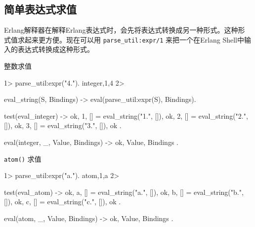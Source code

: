 \documentclass[preview,multi,crop=false,border=1in,class=memoir]{standalone}
\begin{document}
\begin{preview-page}
\section{简单表达式求值}


Erlang解释器在解释Erlang表达式时，会先将表达式转换成另一种形式。这种形
式值求起来更方便。现在可以用 \verb|parse_util:expr/1| 来把一个在Erlang
Shell中输入的表达式转换成这种形式。


整数求值

\begin{ErlangShellSession}
1> parse_util:expr("4.").
{integer,1,4}
2>
\end{ErlangShellSession}


\begin{SourceCode}
eval_string(S, Bindings) ->
    eval(parse_util:expr(S), Bindings).
\end{SourceCode}


\begin{SourceCode}
test(eval_integer) ->
    {ok, 1, []} = eval_string("1.", []),
    {ok, 2, []} = eval_string("2.", []),
    {ok, 3, []} = eval_string("3.", []),
    ok
.
\end{SourceCode}


\begin{SourceCode}
eval({integer, _, Value}, Bindings) ->
    {ok, Value, Bindings}
.
\end{SourceCode}


\verb|atom()| 求值

\begin{ErlangShellSession}
1> parse_util:expr("a.").
{atom,1,a}
2>
\end{ErlangShellSession}


\begin{SourceCode}
test(eval_atom) ->
    {ok, a, []} = eval_string("a.", []),
    {ok, b, []} = eval_string("b.", []),
    {ok, c, []} = eval_string("c.", []),
    ok
.
\end{SourceCode}


\begin{SourceCode}
eval({atom, _, Value}, Bindings) ->
    {ok, Value, Bindings}
.
\end{SourceCode}



\end{preview-page}
\end{document}
